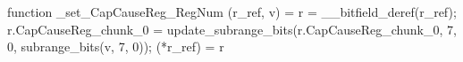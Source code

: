 function _set_CapCauseReg_RegNum (r_ref, v) = {
    r = __bitfield_deref(r_ref);
    r.CapCauseReg_chunk_0 = update_subrange_bits(r.CapCauseReg_chunk_0, 7, 0, subrange_bits(v, 7, 0));
    (*r_ref) = r
}

